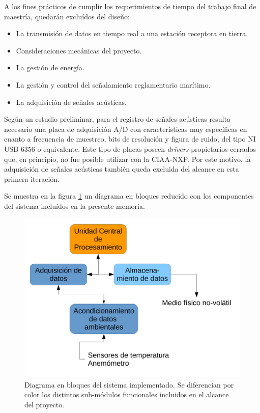 A los fines prácticos de cumplir los requerimientos de tiempo del trabajo final de maestría, quedarán excluídos del diseño:

\begin{itemize}
	\item La transmisión de datos en tiempo real a una estación receptora en tierra.
	\item Consideraciones mecánicas del proyecto.
	\item La gestión de energía.
	\item La gestión y control del señalamiento reglamentario marítimo.
	\item La adquisición de señales acústicas.
\end{itemize}

Según un estudio preliminar, para el registro de señales acústicas resulta necesario una placa de adquisición A/D con características muy específicas en cuanto a frecuencia de muestreo, bits de resolución y figura de ruido, del tipo NI USB-6356 \cite{ni6356} o equivalente.  Este tipo de placas poseen \textit{drivers} propietarios cerrados que, en principio, no fue posible utilizar con la CIAA-NXP.   Por este motivo, la adquisición de señales acústicas también queda excluida del alcance en esta primera iteración.

Se muestra en la figura \ref{fig:diagramaBloquesReducido} un diagrama en bloques reducido con los componentes del sistema incluídos en la presente memoria.

\begin{figure}[ht]
  \centering
	\includegraphics[width=.75\textwidth]{./Figures/Diagrama_en_Bloques_reducido.pdf}
	\caption[Diagrama en bloques implementado]{Diagrama en bloques del sistema implementado. Se diferencian por color los distintos sub-módulos funcionales incluidos en el alcance del proyecto.}
	\label{fig:diagramaBloquesReducido}
\end{figure}





